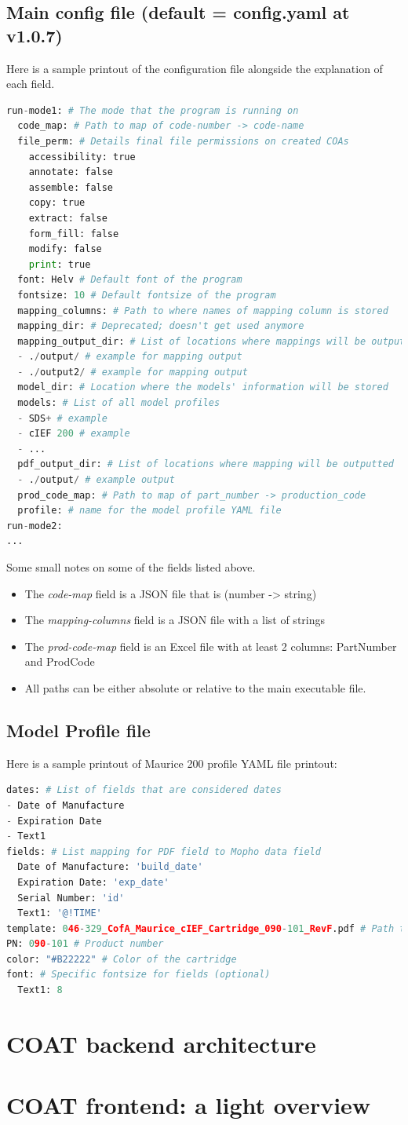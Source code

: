 \documentclass[12pt,a4paper]{article}
\begin{document}
\subsection{Main config file (default = config.yaml at v1.0.7)}
Here is a sample printout of the configuration file alongside the explanation of each field.
\begin{lstlisting}[language=python]
run-mode1: # The mode that the program is running on
  code_map: # Path to map of code-number -> code-name
  file_perm: # Details final file permissions on created COAs
    accessibility: true
    annotate: false
    assemble: false
    copy: true
    extract: false
    form_fill: false
    modify: false
    print: true
  font: Helv # Default font of the program
  fontsize: 10 # Default fontsize of the program
  mapping_columns: # Path to where names of mapping column is stored 
  mapping_dir: # Deprecated; doesn't get used anymore
  mapping_output_dir: # List of locations where mappings will be outputted
  - ./output/ # example for mapping output
  - ./output2/ # example for mapping output
  model_dir: # Location where the models' information will be stored
  models: # List of all model profiles
  - SDS+ # example
  - cIEF 200 # example
  - ...
  pdf_output_dir: # List of locations where mapping will be outputted
  - ./output/ # example output
  prod_code_map: # Path to map of part_number -> production_code
  profile: # name for the model profile YAML file
run-mode2:
...
\end{lstlisting}
Some small notes on some of the fields listed above.
\begin{itemize}
  \item The \textit{code-map} field is a JSON file that is (number -> string)
  \item The \textit{mapping-columns} field is a JSON file with a list of strings
  \item The \textit{prod-code-map} field is an Excel file with at least 2 columns: PartNumber and ProdCode
  \item All paths can be either absolute or relative to the main executable file.
\end{itemize}

\subsection{Model Profile file}
Here is a sample printout of Maurice 200 profile YAML file printout:
\begin{lstlisting}[language=python]
dates: # List of fields that are considered dates
- Date of Manufacture
- Expiration Date
- Text1
fields: # List mapping for PDF field to Mopho data field
  Date of Manufacture: 'build_date'
  Expiration Date: 'exp_date'
  Serial Number: 'id'
  Text1: '@!TIME'
template: 046-329_CofA_Maurice_cIEF_Cartridge_090-101_RevF.pdf # Path to the template file
PN: 090-101 # Product number
color: "#B22222" # Color of the cartridge
font: # Specific fontsize for fields (optional)
  Text1: 8
\end{lstlisting}

\newpage
\section{COAT backend architecture}
\section{COAT frontend: a light overview}
\end{document}
